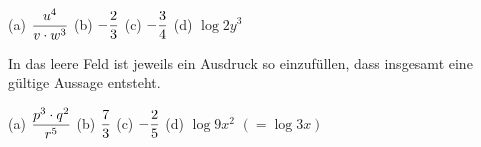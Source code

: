 \documentclass[11pt]{exam}
\begin{document}
\begin{questions}
{\begin{solution}
		(a) $\displaystyle\frac{u^4}{v\cdot w^3}$ \qquad (b) $\displaystyle-\frac{2}{3}$ \qquad (c) $\displaystyle-\frac{3}{4}$ \qquad (d) $\log{2}{y^3}$
\end{solution}}
{}

\question[4]
In das leere Feld ist jeweils ein Ausdruck so einzufüllen, dass insgesamt eine gültige Aussage entsteht.
{\begin{solution}
		(a) $\displaystyle\frac{p^3\cdot q^2}{r^5}$ \qquad (b) $\displaystyle\frac{7}{3}$ \qquad (c) $\displaystyle-\frac{2}{5}$ \qquad (d) $\log{9}{x^2}$ $\left(=\log{3}{x}\right)$
\end{solution}}
{}


\end{questions}
\end{document}
